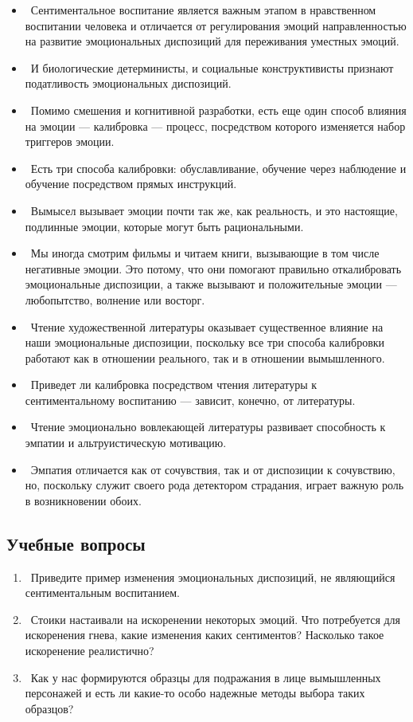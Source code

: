 \documentclass[11pt]{book}
\begin{document}
\begin{itemize}
  \item\ Сентиментальное воспитание является важным этапом в нравственном воспитании человека и отличается от регулирования эмоций направленностью на развитие эмоциональных диспозиций для переживания уместных эмоций.
  \item\ И биологические детерминисты, и социальные конструктивисты признают податливость эмоциональных диспозиций.
  \item\ Помимо смешения и когнитивной разработки, есть еще один способ влияния на эмоции --- калибровка --- процесс, посредством которого изменяется набор триггеров эмоции.
  \item\ Есть три способа калибровки: обуславливание, обучение через наблюдение и обучение посредством прямых инструкций.
  \item\ Вымысел вызывает эмоции почти так же, как реальность, и это настоящие, подлинные эмоции, которые могут быть рациональными.
  \item\ Мы иногда смотрим фильмы и читаем книги, вызывающие в том числе негативные эмоции. Это потому, что они помогают правильно откалибровать эмоциональные диспозиции, а также вызывают и положительные эмоции --- любопытство, волнение или восторг.
  \item\ Чтение художественной литературы оказывает существенное влияние на наши эмоциональные диспозиции, поскольку все три способа калибровки работают как в отношении реального, так и в отношении вымышленного.
  \item\ Приведет ли калибровка посредством чтения литературы к сентиментальному воспитанию --- зависит, конечно, от литературы.
  \item\ Чтение эмоционально вовлекающей литературы развивает способность к эмпатии и альтруистическую мотивацию.
  \item\ Эмпатия отличается как от сочувствия, так и от диспозиции к сочувствию, но, поскольку служит своего рода детектором страдания, играет важную роль в возникновении обоих.
\end{itemize}

\begin{tcolorbox}
  \section{Учебные вопросы}
  \begin{enumerate}
    \item\ Приведите пример изменения эмоциональных диспозиций, не являющийся сентиментальным воспитанием.
    \item\ Стоики настаивали на искоренении некоторых эмоций. Что потребуется для искоренения гнева, какие изменения каких сентиментов? Насколько такое искоренение реалистично?
    \item\ Как у нас формируются образцы для подражания в лице вымышленных персонажей и есть ли какие-то особо надежные методы выбора таких образцов?
  \end{enumerate}
\end{tcolorbox}
\end{document}

